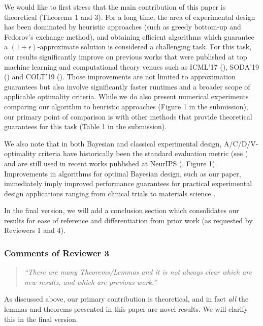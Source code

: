 \documentclass{article}
\begin{document}
We would like to first stress that the main contribution of this
paper is theoretical (Theorems 1 and 3). For a long time, the area of
experimental design has been dominated by heuristic approaches (such
as greedy bottom-up and Fedorov's exchange method), and obtaining efficient
algorithms which guarantee a $(1+\epsilon)$-approximate solution is
considered a challenging task. For this task, our results
significantly improve on previous works that were published at top
machine learning and computational theory venues such as ICML'17
(\cite{pmlr-v70-allen-zhu17e}), SODA'19 (\cite{Nikolov:2019}) and COLT'19
(\cite{pmlr-v99-madan19a}). Those improvements are not limited to
approximation guarantees but also involve significantly faster
runtimes and a broader scope of applicable optimality criteria. While we do also
present numerical experiments comparing our algorithm to heuristic
approaches (Figure 1 in the submission), our primary point of comparison is with other methods that
provide theoretical guarantees for this task (Table 1 in the submission).

We also note that in both Bayesian and classical experimental design, A/C/D/V-optimality criteria have
historically been the standard evaluation metric (see \cite{chaloner1984optimal}) and
are still used in recent works published at NeurIPS
(\cite{mariet2017elementary}, Figure 1).  Improvements in algorithms for
optimal Bayesian design, such as our paper, immediately imply improved
performance guarantees for practical experimental design applications
ranging from clinical trials \cite{flournoy1993clinical,berry2002adaptive}
to materials science \cite{terejanu2012bayesian}. 

In the final version, we will add a conclusion section which
consolidates our results for ease of reference and differentiation
from prior work (as requested by Reviewers 1 and 4). 

\subsubsection*{Comments of Reviewer 3}
\begin{quote}
  \emph{``There are many Theorems/Lemmas and it is not always clear
    which are new results, and which are previous work.''} 
\end{quote}
As discussed above, our primary contribution is theoretical, and in
fact \emph{all} the lemmas and theorems presented in this paper are
novel results. We will clarify this in the final version.
\end{document}
